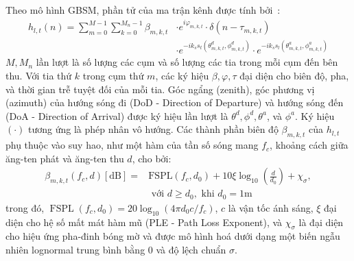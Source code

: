 Theo mô hình GBSM, phần tử của ma trận kênh được tính bởi~\cite{Ju2021}:
\begin{equation}
    \label{eq:3gpp}
    \begin{aligned}
        {h}_{l, t}(n) = \sum\limits_{m=0}^{M-1} \sum\limits_{k=0}^{M_n - 1} \beta_{m, k, t} & \cdot e^{i\varphi_{m, k, t}} \cdot \delta\left(n-\tau_{m, k, t}\right) \\
        &\cdot e^{-i k_s s_t(\theta^d_{m, k, t}, \phi^d_{m, k, t})} \cdot
        e^{-i k_s s_l(\theta^a_{m, k, t}, \phi^a_{m, k, t})} 
    \end{aligned}
\end{equation}
$M, M_n$ lần lượt là số lượng các cụm và số lượng các tia trong mỗi cụm đến bên thu. Với tia thứ $k$ trong cụm thứ $m$, các ký hiệu $\beta, \varphi, \tau$ đại diện cho biên độ, pha, và thời gian trễ tuyệt đối của mỗi tia. Góc ngẩng (zenith), góc phương vị (azimuth) của hướng sóng đi (DoD - Direction of Departure) và hướng sóng đến (DoA - Direction of Arrival) được ký hiệu lần lượt là $\theta^d, \phi^d, \theta^a$, và $\phi^a$. Ký hiệu $(\cdot)$ tương ứng là phép nhân vô hướng. Các thành phần biên độ $\beta_{m,k,t}$ của $h_{l, t}$ phụ thuộc vào suy hao, như một hàm của tần số sóng mang $f_c$, khoảng cách giữa ăng-ten phát và ăng-ten thu $d$, cho bởi:
\begin{equation}
    \label{eq:FSPL}
    \begin{aligned}
        \beta_{m, k, t}(f_c, d)[\mathrm{dB}]=& \mathrm{FSPL}\left(f_c, d_{0}\right)+10 \xi \log _{10}\left(\frac{d}{d_{0}}\right)+\chi_{\sigma}, \\
        & \text { với } d \geq d_{0}, \text { khi } d_{0}=1\mathrm{m}
    \end{aligned}
\end{equation}
trong đó, $\operatorname{FSPL}\left(f_c, d_{0}\right)=20 \log _{10}\left(4 \pi d_{0} c / f_c\right)$, $c$ là vận tốc ánh sáng, $\xi$ đại diện cho hệ số mất mát hàm mũ (PLE - Path Loss Exponent), và $\chi_{\sigma}$ là đại diện cho hiệu ứng pha-đinh bóng mờ và được mô hình hoá dưới dạng một biến ngẫu nhiên lognormal trung bình bằng 0 và độ lệch chuẩn $\sigma$. 
